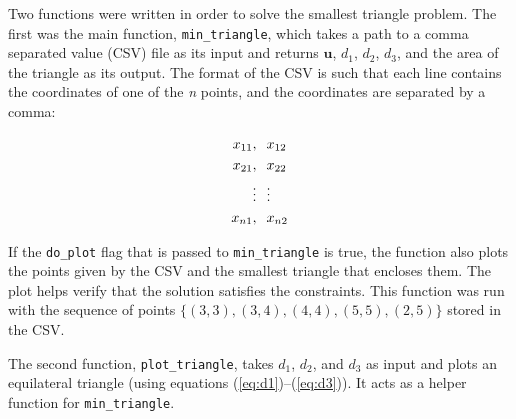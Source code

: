 \documentclass{article}
\begin{document}

Two functions were written in order to solve the smallest triangle problem.
The first was the main function, \texttt{min\_triangle}, which takes a path to a comma separated value (CSV) file as its input and returns $\mathbf{u}$, $d_1$, $d_2$, $d_3$, and the area of the triangle as its output.
The format of the CSV is such that each line contains the coordinates of one of the \textit{n} points, and the coordinates are separated by a comma:

\begin{align*}
x_{11}, & \hspace{0.1in} x_{12}\\
x_{21}, & \hspace{0.1in} x_{22}\\
\vdots & \hspace{0.1in} \vdots\\
x_{n1}, & \hspace{0.1in} x_{n2}
\end{align*}

\noindent If the \texttt{do\_plot} flag that is passed to \texttt{min\_triangle} is true, the function also plots the points given by the CSV and the smallest triangle that encloses them.
The plot helps verify that the solution satisfies the constraints.
This function was run with the sequence of points $\{(3,3), (3,4), (4,4), (5,5), (2,5)\}$ stored in the CSV.

The second function, \texttt{plot\_triangle}, takes $d_1$, $d_2$, and $d_3$ as input and plots an equilateral triangle (using equations (\ref{eq:d1})--(\ref{eq:d3})).
It acts as a helper function for \texttt{min\_triangle}.
\end{document}
